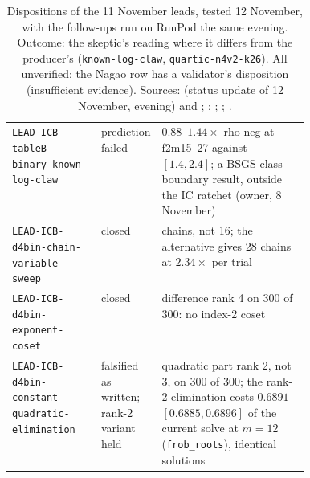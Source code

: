 \begin{table}[tbp]
\begin{tabularx}{\linewidth}{@{}>{\raggedright}p{0.30\linewidth}>{\raggedright}p{0.13\linewidth}>{\raggedright\arraybackslash}X@{}}
\addlinespace
\texttt{LEAD-ICB-tableB-binary-\allowbreak known-log-claw} & prediction failed & $0.88$--$1.44\times$ rho-neg at f2m15--27 against $[1.4,2.4]$; a BSGS-class boundary result, outside the IC ratchet (owner, 8 November) \\
\texttt{LEAD-ICB-d4bin-chain-variable-sweep} & closed & 12 chains, not 16; the alternative gives 28 chains at $2.34\times$ per trial \\
\texttt{LEAD-ICB-d4bin-exponent-coset} & closed & difference rank 4 on 300 of 300: no index-2 coset \\
\texttt{LEAD-ICB-d4bin-constant-\allowbreak quadratic-elimination} & falsified as written; rank-2 variant held & quadratic part rank 2, not 3, on 300 of 300; the rank-2 elimination costs $0.6891$ $[0.6885,0.6896]$ of the current solve at $m=12$ (\texttt{frob\_roots}), identical solutions \\
\bottomrule
\end{tabularx}
\caption[]{Dispositions of the 11 November leads, tested 12 November,
with the follow-ups run on RunPod the same evening. Outcome: the skeptic's
reading where it differs from the producer's (\texttt{known-log-claw},
\texttt{quartic-n4v2-k26}). All unverified; the Nagao row has a
validator's disposition (insufficient evidence). Sources:
 (status update of 12 November,
evening) and ;
;
;
;
.}
\label{tab:open-leads1111}
\end{table}

